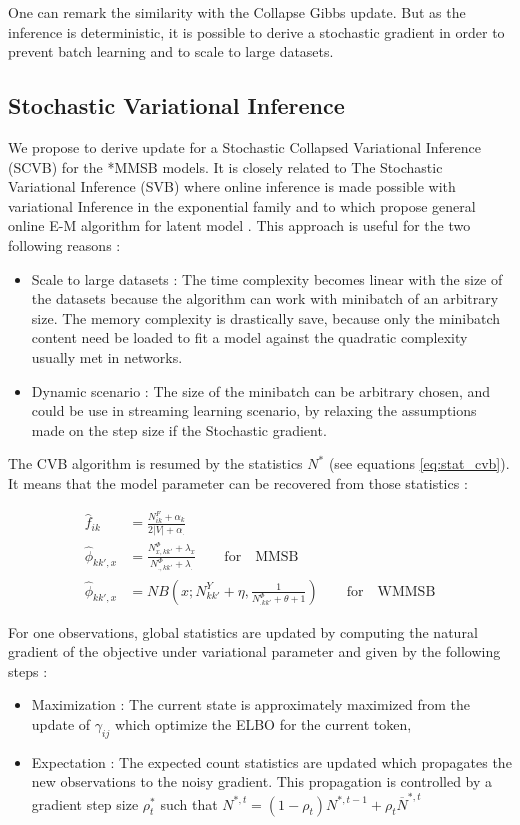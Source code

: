 One can remark the similarity with the Collapse Gibbs update. But as the inference is deterministic, it is possible to derive a stochastic gradient in order to prevent batch learning and to scale to large datasets.

\subsection{Stochastic Variational Inference}

We propose to derive update for a Stochastic Collapsed Variational Inference (SCVB) for the *MMSB models. It is closely related to The Stochastic Variational Inference (SVB)  where online inference is made possible with variational Inference in the exponential family and to \cite{hoffman2013stochastic} which propose general online E-M algorithm for latent model \cite{cappe2009line}. This approach is useful for the two following reasons :

\begin{itemize}
    \item Scale to large datasets : The time complexity becomes linear with the size of the datasets because the algorithm can work with minibatch of an arbitrary size. The memory complexity is drastically save, because only the minibatch content need be loaded to fit a model against the quadratic complexity usually met in networks.
    \item Dynamic scenario : The size of the minibatch can be arbitrary chosen, and could be use in streaming learning scenario, by relaxing the assumptions made on the step size if the Stochastic gradient.
\end{itemize}

The CVB algorithm is resumed by the statistics $N^*$ (see equations \eqref{eq:stat_cvb}). It means that the model parameter can be recovered from those statistics :

\begin{align}
    \hat f_{ik} &= \frac{N^{F}_{ik} + \alpha_k }{2|V| + \alpha_{\bm{.}}} \\
    \hat \phi_{kk',x} &= \frac{ N^{\Phi}_{x, kk'} + \lambda_x}{N^{\Phi}_{\bm{.}, kk'} + \lambda_{\bm{.}}}  \qquad \mathrm{for}\quad\mathrm{MMSB}\\
    \hat \phi_{kk',x} &= NB(x; N^Y_{kk'} + \eta, \frac{1}{N^{\Phi}_{\bm{.}kk'} + \theta + 1} ) \qquad \mathrm{for}\quad\mathrm{WMMSB}
\end{align}

For one observations, global statistics are updated by computing the natural gradient of the objective under variational parameter and given by the following steps :
\begin{itemize}
    \item Maximization : The current state is approximately maximized from the update of $\gamma_{ij}$ which optimize the ELBO for the current token,
    \item Expectation : The expected count statistics are updated which propagates the new observations to the noisy gradient. This propagation is controlled by a gradient step size $\rho^{*}_t$ such that $N^{*, t} = (1-\rho_t)N^{*,t-1} + \rho_t \overline N^{*,t}$
\end{itemize}

